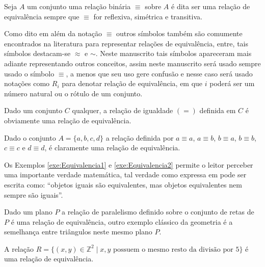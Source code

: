 \begin{definition}\label{def:RelacaoEquivalencia}
	Seja $A$ um conjunto uma relação binária $\equiv$ sobre $A$ é dita ser uma relação de equivalência sempre que $\equiv$ for reflexiva, simétrica e transitiva.
\end{definition}

\begin{remark}
	Como dito em \cite{carmo2013} além da notação $\equiv$ outros símbolos também são comumente encontrados na literatura para representar relações de equivalência, entre, tais símbolos destacam-se $\approx$ e $\sim$. Neste manuscrito tais símbolos apareceram mais adiante representando outros conceitos, assim neste manuscrito será usado sempre usado o símbolo $\equiv$, a menos que seu uso gere confusão e nesse caso será usado notações como $R_i$ para denotar relação de equivalência, em que $i$ poderá ser um número natural ou o rótulo de um conjunto.
\end{remark}

\begin{example}\label{exe:Equivalencia1}
	Dado um conjunto $C$ qualquer, a relação de igualdade $(=)$ definida em $C$ é obviamente uma relação de equivalência.
\end{example}

\begin{example}\label{exe:Equivalencia2}
	Dado o conjunto $A =\{a, b, c, d\}$ a relação definida por $a \equiv a$, $a \equiv b$, $b \equiv a$, $b \equiv b$, $c \equiv c$ e $d \equiv d$, é claramente uma relação de equivalência.
\end{example}

Os Exemplos \ref{exe:Equivalencia1} e \ref{exe:Equivalencia2} permite o leitor perceber uma importante verdade matemática, tal verdade como expressa em \cite{carmo2013} pode ser escrita como: ``objetos iguais são equivalentes, mas objetos equivalentes nem sempre são iguais''.

\begin{example}
	Dado um plano $P$ a relação de paralelismo definido sobre o conjunto de retas de $P$ é uma relação de equivalência, outro exemplo clássico da geometria é a semelhança entre triângulos neste mesmo plano $P$.
\end{example}

\begin{example}
	A relação $R = \{(x, y) \in \mathbb{Z}^2 \mid x, y \text{ possuem o mesmo resto da divisão por } 5\}$ é uma relação de equivalência.
\end{example}

